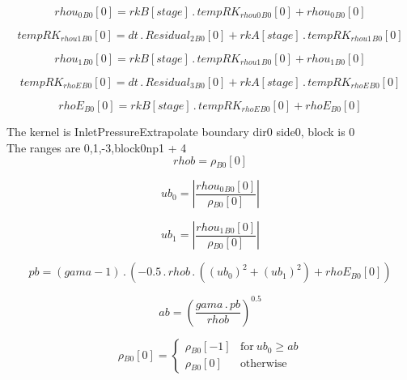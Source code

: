 \documentclass{article}
\begin{document}
\begin{dmath}{rhou_{0}{_{B0}}}[{0}] = {rkB}[{stage}] \,.\, {tempRK_{rhou0}{_{B0}}}[{0}] + {rhou_{0}{_{B0}}}[{0}]\end{dmath}

\begin{dmath}{tempRK_{rhou1}{_{B0}}}[{0}] = dt \,.\, {Residual_{2}{_{B0}}}[{0}] + {rkA}[{stage}] \,.\, {tempRK_{rhou1}{_{B0}}}[{0}]\end{dmath}

\begin{dmath}{rhou_{1}{_{B0}}}[{0}] = {rkB}[{stage}] \,.\, {tempRK_{rhou1}{_{B0}}}[{0}] + {rhou_{1}{_{B0}}}[{0}]\end{dmath}

\begin{dmath}{tempRK_{rhoE}{_{B0}}}[{0}] = dt \,.\, {Residual_{3}{_{B0}}}[{0}] + {rkA}[{stage}] \,.\, {tempRK_{rhoE}{_{B0}}}[{0}]\end{dmath}

\begin{dmath}{rhoE{_{B0}}}[{0}] = {rkB}[{stage}] \,.\, {tempRK_{rhoE}{_{B0}}}[{0}] + {rhoE{_{B0}}}[{0}]\end{dmath}

\noindent The kernel is InletPressureExtrapolate boundary dir0 side0, block is 0\\\noindent The ranges are 0,1,-3,block0np1 + 4\\\begin{dmath}rhob = {\rho{_{B0}}}[{0}]\end{dmath}

\begin{dmath}ub_{0} = \left|{\frac{{rhou_{0}{_{B0}}}[{0}]}{{\rho{_{B0}}}[{0}]}}\right|\end{dmath}

\begin{dmath}ub_{1} = \left|{\frac{{rhou_{1}{_{B0}}}[{0}]}{{\rho{_{B0}}}[{0}]}}\right|\end{dmath}

\begin{dmath}pb = \left(gama - 1\right) \,.\, \left(- 0.5 \,.\, rhob \,.\, \left(\left(ub_{0} \right)^{2} + \left(ub_{1} \right)^{2}\right) + {rhoE{_{B0}}}[{0}]\right)\end{dmath}

\begin{dmath}ab = \left(\frac{gama \,.\, pb}{rhob} \right)^{0.5}\end{dmath}

\begin{dmath}{\rho{_{B0}}}[{0}] = \begin{cases} {\rho{_{B0}}}[{-1}] & \text{for}\: ub_{0} \geq ab \\{\rho{_{B0}}}[{0}] & \text{otherwise} \end{cases}\end{dmath}
\end{document}
